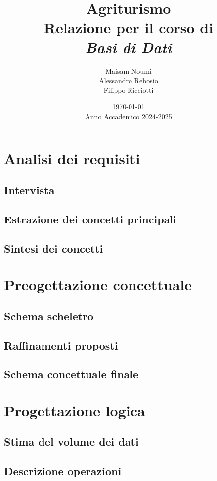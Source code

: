 \documentclass[a4paper,11pt]{report}
\title{
    \vspace*{2cm}
    \Huge\textbf{Agriturismo} \\[0.5cm]
    \LARGE Relazione per il corso di \\[0.2cm]
    \textit{Basi di Dati} \\[2cm]
}
\author{
    \Large
    Maisam Noumi \\
    Alessandro Rebosio \\
    Filippo Ricciotti
}
\date{
    \vspace{1cm}
    \today \\[0.5cm]
    Anno Accademico 2024-2025
}
\begin{document}
\maketitle

\tableofcontents

\chapter{Analisi dei requisiti}

\section{Intervista}

\section{Estrazione dei concetti principali}

\section{Sintesi dei concetti}

\chapter{Preogettazione concettuale}
\section{Schema scheletro}
\section{Raffinamenti proposti}

\section{Schema concettuale finale}


\chapter{Progettazione logica}
\section{Stima del volume dei dati}

\section{Descrizione operazioni}
\end{document}
